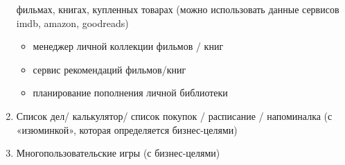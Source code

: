 \documentclass[12pt, a4paper]{article}
\begin{document}
\begin{enumerate}
          фильмах, книгах, купленных товарах (можно использовать данные
          сервисов imdb, amazon, goodreads)
          \begin{itemize} \itemsep0em
              \item менеджер личной коллекции фильмов / книг
              \item сервис рекомендаций фильмов/книг
              \item планирование пополнения личной библиотеки
          \end{itemize}
    \item Список дел/ калькулятор/ список покупок / расписание /
          напоминалка (с «изюминкой», которая определяется бизнес-целями)
    \item Многопользовательские игры (с бизнес-целями)
\end{enumerate}
\end{document}
